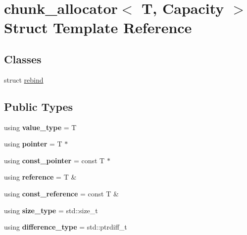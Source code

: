 \hypertarget{structchunk__allocator}{}\section{chunk\+\_\+allocator$<$ T, Capacity $>$ Struct Template Reference}
\label{structchunk__allocator}
\subsection*{Classes}
\begin{DoxyCompactItemize}
\item 
struct \hyperlink{structchunk__allocator_1_1rebind}{rebind}
\end{DoxyCompactItemize}
\subsection*{Public Types}
\begin{DoxyCompactItemize}
\item 
\mbox{\label{structchunk__allocator_ac61f74d975f387aa15131dc7186820b3}} 
using {\bfseries value\+\_\+type} = T
\item 
\mbox{\label{structchunk__allocator_af080dd90c412bf9168dc270092b4afdd}} 
using {\bfseries pointer} = T $\ast$
\item 
\mbox{\label{structchunk__allocator_ab5bae3912d5bf5a0394e37c1bf2903eb}} 
using {\bfseries const\+\_\+pointer} = const T $\ast$
\item 
\mbox{\label{structchunk__allocator_a3d22fb0c218b0710cd9655713121ff2e}} 
using {\bfseries reference} = T \&
\item 
\mbox{\label{structchunk__allocator_acca99216b2271df6d9002ed7e17da046}} 
using {\bfseries const\+\_\+reference} = const T \&
\item 
\mbox{\label{structchunk__allocator_a3f4db1944c48d59ba683e60afc32df95}} 
using {\bfseries size\+\_\+type} = std\+::size\+\_\+t
\item 
\mbox{\label{structchunk__allocator_ad4b62e68f52cbf1e787f354eb269f992}} 
using {\bfseries difference\+\_\+type} = std\+::ptrdiff\+\_\+t
\end{DoxyCompactItemize}
